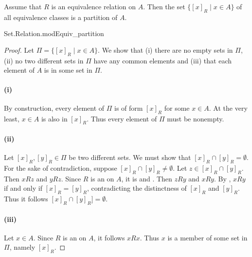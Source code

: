 \documentclass{report}
\begin{document}
  \begin{theorem}[3P]
    Assume that $R$ is an equivalence relation on $A$.
    Then the set $\{[x]_R \mid x \in A\}$ of all equivalence classes is a
      partition of $A$.
  \end{theorem}

    {Set.Relation.modEquiv\_partition}

  \begin{proof}
    Let $\Pi = \{[x]_R \mid x \in A\}$.
    We show that (i) there are no empty sets in $\Pi$, (ii) no two different
      sets in $\Pi$ have any common elements and (iii) that each element of $A$
      is in some set in $\Pi$.

    \paragraph{(i)}%

      By construction, every element of $\Pi$ is of form $[x]_R$ for some
        $x \in A$.
      At the very least, $x \in A$ is also in $[x]_R$.
      Thus every element of $\Pi$ must be nonempty.

    \paragraph{(ii)}%

      Let $[x]_R, [y]_R \in \Pi$ be two different sets.
      We must show that $[x]_R \cap [y]_R = \emptyset$.
      For the sake of contradiction, suppose $[x]_R \cap [y]_R \neq \emptyset$.
      Let $z \in [x]_R \cap [y]_R$.
      Then $xRz$ and $yRz$.
      Since $R$ is an  on $A$, it is
         and .
      Then $zRy$ and $xRy$.
      By , $xRy$ if and only if $[x]_R = [y]_R$,
        contradicting the distinctness of $[x]_R$ and $[y]_R$.
      Thus it follows $[x]_R \cap [y]_R] = \emptyset$.

    \paragraph{(iii)}%

      Let $x \in A$.
      Since $R$ is an  on $A$, it follows
        $xRx$.
      Thus $x$ is a member of some set in $\Pi$, namely $[x]_R$.

  \end{proof}
\end{document}
